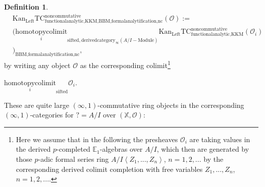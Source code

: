 \documentclass[11pt]{book}
\theoremstyle{definition}
\newtheorem{definition}[theorem]{Definition}
\numberwithin{equation}{section}
\begin{document}
\begin{definition}
\begin{align}
	&\mathrm{Kan}_{\mathrm{Left}}\mathrm{TC}^\mathrm{noncommutative}_{\text{functionalanalytic,KKM},\text{BBM,formalanalytification,nc}}(\mathcal{O}):=\\
	&(\underset{i}{\text{homotopycolimit}}_{\text{sifted},\text{derivedcategory}_{\infty}(A/I-\text{Module})}\mathrm{Kan}_{\mathrm{Left}}\mathrm{TC}^\mathrm{noncommutative}_{\text{functionalanalytic,KKM}}(\mathcal{O}_i)\\
	&)_\text{BBM,formalanalytification,nc},
\end{align}
by writing any object $\mathcal{O}$ as the corresponding colimit\footnote{Here we assume that in the following the presheaves $\mathcal{O}_i$ are taking values in the derived $p$-completed $\mathbb{E}_1$-algebras over $A/I$, which then are generated by those $p$-adic formal series ring $A/I\left<Z_1,...,Z_n\right>$, $n=1,2,...$ by the corresponding derived colimit completion with free variables $Z_1,...,Z_n$, $n=1,2,...$.} 
\begin{center}
$\underset{i}{\text{homotopycolimit}}_\text{sifted}\mathcal{O}_i$.
\end{center}
These are quite large $(\infty,1)$-commutative ring objects in the corresponding $(\infty,1)$-categories for $?=A/I$ over $(\mathbb{X},\mathcal{O})$:


\end{definition}
\end{document}

